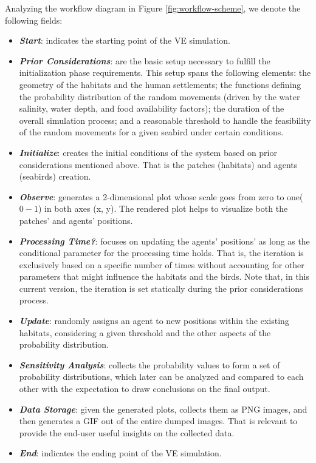 Analyzing the workflow diagram in Figure \ref{fig:workflow-scheme}, we denote the following fields:
\begin{itemize}
    \item \textbf{\textit{Start}}: indicates the starting point of the VE simulation.
    \item \textbf{\textit{Prior Considerations}}: are the basic setup necessary to fulfill the initialization phase requirements. This setup spans the following elements: the geometry of the habitats and the human settlements; the functions defining the probability distribution of the random movements (driven by the water salinity, water depth, and food availability factors); the duration of the overall simulation process; and a reasonable threshold to handle the feasibility of the random movements for a given seabird under certain conditions.
    \item \textbf{\textit{Initialize}}: creates the initial conditions of the system based on prior considerations mentioned above. That is the patches (habitats) and agents (seabirds) creation.
    \item \textbf{\textit{Observe}}: generates a 2-dimensional plot whose scale goes from zero to one(\emph{$0-1$}) in both axes (x, y). The rendered plot helps to visualize both the patches' and agents' positions.
    \item \textbf{\textit{Processing Time?}}: focuses on updating the agents' positions' as long as the conditional parameter for the processing time holds. That is, the iteration is exclusively based on a specific number of times without accounting for other parameters that might influence the habitats and the birds. Note that, in this current version, the iteration is set statically during the prior considerations process.
    \item \textbf{\textit{Update}}: randomly assigns an agent to new positions within the existing habitats, considering a given threshold and the other aspects of the probability distribution.
    \item \textbf{\textit{Sensitivity Analysis}}: collects the probability values to form a set of probability distributions, which later can be analyzed and compared to each other with the expectation to draw conclusions on the final output.
    \item \textbf{\textit{Data Storage}}: given the generated plots, collects them as PNG images, and then generates a GIF \cite{imageio} out of the entire dumped images. That is relevant to provide the end-user useful insights on the collected data.
    \item \textbf{\textit{End}}: indicates the ending point of the VE simulation.
\end{itemize}

